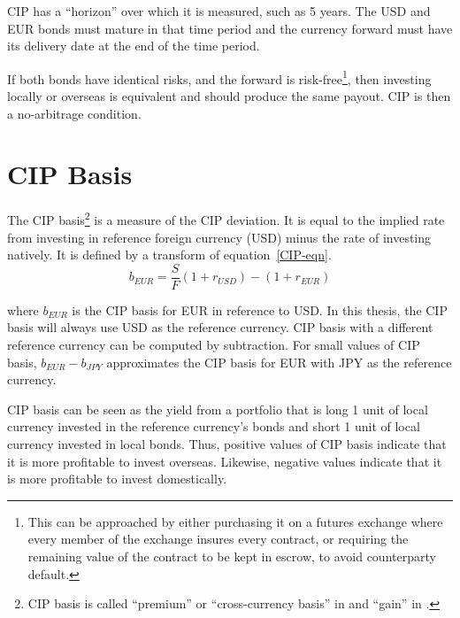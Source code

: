 CIP has a ``horizon'' over which it is measured, such as 5 years.  The USD and EUR bonds must mature in that time period and the currency forward must have its delivery date at the end of the time period.  


If both bonds have identical risks, and the forward is risk-free\footnote{This can be approached by either purchasing it on a futures exchange where every member of the exchange insures every contract, or requiring the remaining value of the contract to be kept in escrow, to avoid counterparty default.}, then investing locally or overseas is equivalent and should produce the same payout.  CIP is then a no-arbitrage condition. 


\section{CIP Basis}


The CIP basis\footnote{CIP basis is called ``premium'' or ``cross-currency basis'' in \cite{Du2017} and ``gain'' in \cite{Ito1983}.} is a measure of the CIP deviation.  It is equal to the implied rate from investing in reference foreign currency (USD) minus the rate of investing natively.  It is defined by a transform of equation~\ref{CIP-eqn}.
\begin{equation} 
  \label{basis-eqn} 
   b_{EUR} = \frac{S}{F}(1 + r_{USD}) - (1 + r_{EUR})
\end{equation} 

\noindent where $b_{EUR}$ is the CIP basis for EUR in reference to USD.  In this thesis, the CIP basis will always use USD as the reference currency.   CIP basis with a different reference currency can be computed by subtraction.  For small values of CIP basis, $b_{EUR} - b_{JPY}$ approximates the CIP basis for EUR with JPY as the reference currency.  

CIP basis can be seen as the yield from a portfolio that is long 1 unit of local currency invested in the reference currency's bonds and short 1 unit of local currency invested in local bonds.  Thus, positive values of CIP basis indicate that it is more profitable to invest overseas.  Likewise, negative values indicate that it is more profitable to invest domestically.  

